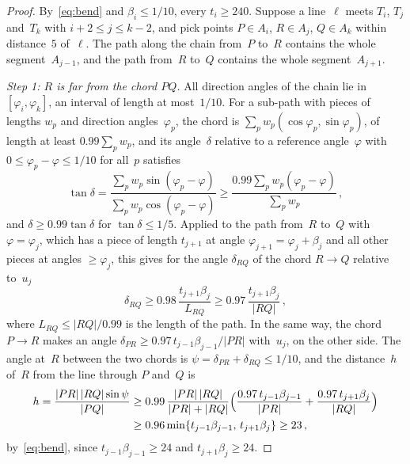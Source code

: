 \documentclass[11pt,letterpaper]{article}
\begin{document}
\begin{proof}
By~\eqref{eq:bend} and $\beta_i\le1/10$, every $t_i\ge240$. Suppose a line~$\ell$ meets $T_i$, $T_j$ and~$T_k$ with $i+2\le j\le k-2$, and pick points $P\in A_i$, $R\in A_j$, $Q\in A_k$ within distance~$5$ of~$\ell$. The path along the chain from~$P$ to~$R$ contains the whole segment~$A_{j-1}$, and the path from~$R$ to~$Q$ contains the whole segment~$A_{j+1}$.

\emph{Step 1: $R$ is far from the chord $PQ$.} All direction angles of the chain lie in $[\varphi_i,\varphi_k]$, an interval of length at most~$1/10$. For a sub-path with pieces of lengths $w_p$ and direction angles~$\varphi_p$, the chord is $\sum_pw_p(\cos\varphi_p,\sin\varphi_p)$, of length at least $0.99\sum_pw_p$, and its angle~$\delta$ relative to a reference angle~$\varphi$ with $0\le\varphi_p-\varphi\le1/10$ for all~$p$ satisfies
\begin{equation*}
  \tan\delta=\frac{\sum_pw_p\sin(\varphi_p-\varphi)}{\sum_pw_p\cos(\varphi_p-\varphi)}\ge\frac{0.99\sum_pw_p(\varphi_p-\varphi)}{\sum_pw_p}\,,
\end{equation*}
and $\delta\ge0.99\tan\delta$ for $\tan\delta\le1/5$. Applied to the path from~$R$ to~$Q$ with $\varphi=\varphi_j$, which has a piece of length $t_{j+1}$ at angle $\varphi_{j+1}=\varphi_j+\beta_j$ and all other pieces at angles $\ge\varphi_j$, this gives for the angle $\delta_{RQ}$ of the chord $R\to Q$ relative to~$u_j$
\begin{equation*}
  \delta_{RQ}\ge0.98\,\frac{t_{j+1}\beta_j}{L_{RQ}}\ge0.97\,\frac{t_{j+1}\beta_j}{\lvert RQ\rvert}\,,
\end{equation*}
where $L_{RQ}\le\lvert RQ\rvert/0.99$ is the length of the path. In the same way, the chord $P\to R$ makes an angle $\delta_{PR}\ge0.97\,t_{j-1}\beta_{j-1}/\lvert PR\rvert$ with~$u_j$, on the other side. The angle at~$R$ between the two chords is $\psi=\delta_{PR}+\delta_{RQ}\le1/10$, and the distance~$h$ of~$R$ from the line through $P$ and~$Q$ is
\begin{align*}
  h=\frac{\lvert PR\rvert\,\lvert RQ\rvert\sin\psi}{\lvert PQ\rvert}
  &\ge0.99\,\frac{\lvert PR\rvert\,\lvert RQ\rvert}{\lvert PR\rvert+\lvert RQ\rvert}\Bigl(\frac{0.97\,t_{j-1}\beta_{j-1}}{\lvert PR\rvert}+\frac{0.97\,t_{j+1}\beta_j}{\lvert RQ\rvert}\Bigr)\\
  &\ge0.96\min\{t_{j-1}\beta_{j-1},\,t_{j+1}\beta_j\}\ge23\,,
\end{align*}
by~\eqref{eq:bend}, since $t_{j-1}\beta_{j-1}\ge24$ and $t_{j+1}\beta_j\ge24$.


\end{proof}
\end{document}
